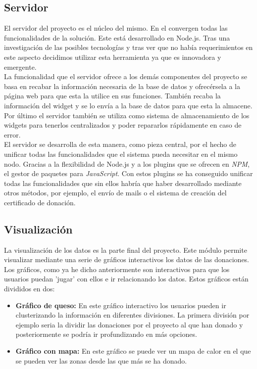 \subsection{Servidor}


El servidor del proyecto es el núcleo del mismo. En el convergen todas las funcionalidades de la solución. Este está desarrollado en Node.js. Tras una investigación de las posibles tecnologías y tras ver que no había requerimientos en este aspecto decidimos utilizar esta herramienta ya que es innovadora y emergente.\\

La funcionalidad que el servidor ofrece a los demás componentes del proyecto se basa en recabar la información necesaria de la base de datos y ofrecérsela a la página web para que esta la utilice en sus funciones. También recaba la información del widget y se lo envía a la base de datos para que esta la almacene. Por último el servidor también se utiliza como sistema de almacenamiento de los widgets para tenerlos centralizados y poder repararlos rápidamente en caso de error.\\

El servidor se desarrolla de esta manera, como pieza central, por el hecho de unificar todas las funcionalidades que el sistema pueda necesitar en el mismo nodo. Gracias a la flexibilidad de Node.js y a los plugins que se ofrecen en \textit{NPM}, el gestor de paquetes para \textit{JavaScript}. Con estos plugins se ha conseguido unificar todas las funcionalidades que sin ellos habría que haber desarrollado mediante otros métodos, por ejemplo, el envío de mails o el sistema de creación del certificado de donación.

\subsection{Visualización}

La visualización de los datos es la parte final del proyecto. Este módulo permite visualizar mediante una serie de gráficos interactivos los datos de las donaciones. Los gráficos, como ya he dicho anteriormente son interactivos para que los usuarios puedan 'jugar' con ellos e ir relacionando los datos. Estos gráficos están divididos en dos:

\begin{itemize}
	\item \textbf{Gráfico de queso:} En este gráfico interactivo los usuarios pueden ir clusterizando la información en diferentes divisiones. La primera división por ejemplo seria la dividir las donaciones por el proyecto al que han donado y posteriormente se podría ir profundizando en más opciones.
	\item \textbf{Gráfico con mapa:} En este gráfico se puede ver un mapa de calor en el que se pueden ver las zonas desde las que más se ha donado.
\end{itemize}

